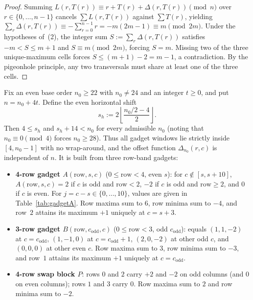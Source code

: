 \documentclass[11pt]{article}
\begin{document}
\begin{proof}
Summing $L(r, T(r)) \equiv r + T(r) + \Delta(r, T(r)) \pmod{n}$ over $r \in \{0,\dots,n-1\}$ cancels $\sum L(r, T(r))$ against $\sum T(r)$, yielding $\sum_r \Delta(r, T(r)) \equiv -\sum_{r=0}^{n-1} r = -m(2m - 1) \equiv m \pmod{2m}$. Under the hypotheses of~(2), the integer sum $S := \sum_r \Delta(r, T(r))$ satisfies $-m < S \le m + 1$ and $S \equiv m \pmod{2m}$, forcing $S = m$. Missing two of the three unique-maximum cells forces $S \le (m + 1) - 2 = m - 1$, a contradiction. By the pigeonhole principle, any two transversals must share at least one of the three cells.
\end{proof}

Fix an even base order $n_0 \ge 22$ with $n_0 \ne 24$ and an integer $t \ge 0$, and put $n = n_0 + 4t$. Define the even horizontal shift
\[
  s_h := 2\left\lfloor \frac{n_0/2 - 4}{2} \right\rfloor.
\]
Then $4 \le s_h$ and $s_h + 14 < n_0$ for every admissible $n_0$ (noting that $n_0 \equiv 0 \pmod 4$ forces $n_0 \ge 28$). Thus all gadget windows lie strictly inside $[4, n_0 - 1]$ with no wrap-around, and the offset function $\Delta_{n_0}(r, c)$ is independent of $n$. It is built from three row-band gadgets:

\begin{itemize}
  \item \textbf{4-row gadget $A(\mathrm{row}, s, c)$} ($0 \le \mathrm{row} < 4$, even $s$): for $c \notin [s, s+10]$, $A(\mathrm{row}, s, c) = 2$ if $c$ is odd and $\mathrm{row} < 2$, $-2$ if $c$ is odd and $\mathrm{row} \ge 2$, and $0$ if $c$ is even. For $j = c - s \in \{0,\dots,10\}$, values are given in Table~\ref{tab:gadgetA}. Row maxima sum to $6$, row minima sum to $-4$, and row~$2$ attains its maximum $+1$ uniquely at $c = s + 3$.
  \item \textbf{3-row gadget $B(\mathrm{row}, c_{\mathrm{odd}}, c)$} ($0 \le \mathrm{row} < 3$, odd $c_{\mathrm{odd}}$): equals $(1, 1, -2)$ at $c = c_{\mathrm{odd}}$, $(1, -1, 0)$ at $c = c_{\mathrm{odd}} + 1$, $(2, 0, -2)$ at other odd $c$, and $(0, 0, 0)$ at other even $c$. Row maxima sum to $3$, row minima sum to $-3$, and row~$1$ attains its maximum $+1$ uniquely at $c = c_{\mathrm{odd}}$.
  \item \textbf{4-row swap block $P$}: rows $0$ and $2$ carry $+2$ and $-2$ on odd columns (and $0$ on even columns); rows $1$ and $3$ carry $0$. Row maxima sum to $2$ and row minima sum to $-2$.
\end{itemize}
\end{document}
